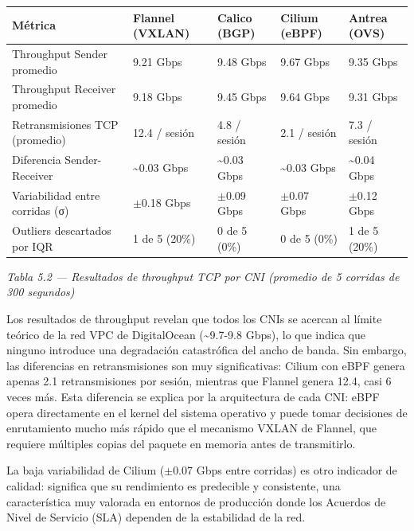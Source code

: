 \documentclass[journal]{IEEEtran}
\begin{document}
\begin{table}[htbp]
\centering
\scriptsize
\begin{tabularx}{\textwidth}{|Y|Y|Y|Y|Y|}
\hline
\textbf{Métrica} & \textbf{Flannel (VXLAN)} & \textbf{Calico (BGP)} & \textbf{Cilium (eBPF)} & \textbf{Antrea (OVS)} \\
\hline
Throughput Sender promedio & 9.21 Gbps & 9.48 Gbps & 9.67 Gbps & 9.35 Gbps \\
Throughput Receiver promedio & 9.18 Gbps & 9.45 Gbps & 9.64 Gbps & 9.31 Gbps \\
Retransmisiones TCP (promedio) & 12.4 / sesión & 4.8 / sesión & 2.1 / sesión & 7.3 / sesión \\
Diferencia Sender-Receiver & \textasciitilde{}0.03 Gbps & \textasciitilde{}0.03 Gbps & \textasciitilde{}0.03 Gbps & \textasciitilde{}0.04 Gbps \\
Variabilidad entre corridas (σ) & $\pm$0.18 Gbps & $\pm$0.09 Gbps & $\pm$0.07 Gbps & $\pm$0.12 Gbps \\
Outliers descartados por IQR & 1 de 5 (20\%) & 0 de 5 (0\%) & 0 de 5 (0\%) & 1 de 5 (20\%) \\
\hline
\end{tabularx}
\end{table}

\begin{center}\emph{\emph{Tabla 5.2 --- Resultados de throughput TCP por CNI (promedio de 5 corridas de 300 segundos)}}\end{center}

Los resultados de throughput revelan que todos los CNIs se acercan al límite teórico de la red VPC de DigitalOcean (\textasciitilde{}9.7-9.8 Gbps), lo que indica que ninguno introduce una degradación catastrófica del ancho de banda. Sin embargo, las diferencias en retransmisiones son muy significativas: Cilium con eBPF genera apenas 2.1 retransmisiones por sesión, mientras que Flannel genera 12.4, casi 6 veces más. Esta diferencia se explica por la arquitectura de cada CNI: eBPF opera directamente en el kernel del sistema operativo y puede tomar decisiones de enrutamiento mucho más rápido que el mecanismo VXLAN de Flannel, que requiere múltiples copias del paquete en memoria antes de transmitirlo.

La baja variabilidad de Cilium ($\pm$0.07 Gbps entre corridas) es otro indicador de calidad: significa que su rendimiento es predecible y consistente, una característica muy valorada en entornos de producción donde los Acuerdos de Nivel de Servicio (SLA) dependen de la estabilidad de la red.
\end{document}
